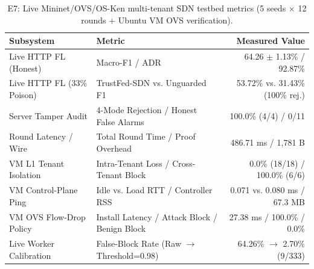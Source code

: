 \begin{table}[t]
\centering
\caption{E7: Live Mininet/OVS/OS-Ken multi-tenant SDN testbed metrics (5 seeds $\times$ 12 rounds + Ubuntu VM OVS verification).}
\label{tab:e7_live}
\begin{tabular}{llr}
\toprule
Subsystem & Metric & Measured Value \\
\midrule
Live HTTP FL (Honest) & Macro-F1 / ADR & 64.26 $\pm$ 1.13\% / 92.87\% \\
Live HTTP FL (33\% Poison) & TrustFed-SDN vs. Unguarded F1 & 53.72\% vs. 31.43\% (100\% rej.) \\
Server Tamper Audit & 4-Mode Rejection / Honest False Alarms & 100.0\% (4/4) / 0/11 \\
Round Latency / Wire & Total Round Time / Proof Overhead & 486.71 ms / 1,781 B \\
VM L1 Tenant Isolation & Intra-Tenant Loss / Cross-Tenant Block & 0.0\% (18/18) / 100.0\% (6/6) \\
VM Control-Plane Ping & Idle vs. Load RTT / Controller RSS & 0.071 vs. 0.080 ms / 67.3 MB \\
VM OVS Flow-Drop Policy & Install Latency / Attack Block / Benign Block & 27.38 ms / 100.0\% / 0.0\% \\
Live Worker Calibration & False-Block Rate (Raw $\to$ Threshold=0.98) & 64.26\% $\to$ 2.70\% (9/333) \\
\bottomrule
\end{tabular}
\end{table}
